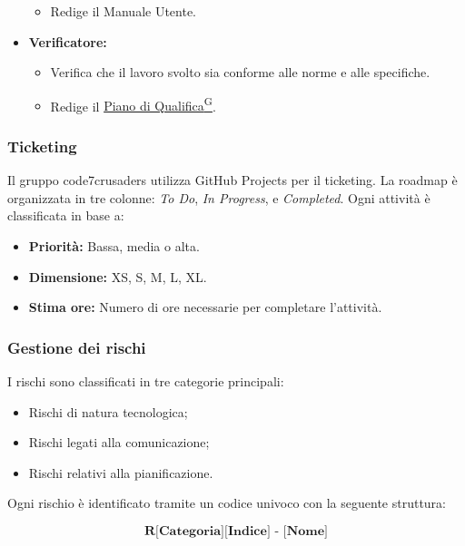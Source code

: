 \begin{itemize}
\begin{itemize}
        \item Redige il Manuale Utente.
    \end{itemize}
    \item \textbf{Verificatore:}
    \begin{itemize}
        \item Verifica che il lavoro svolto sia conforme alle norme e alle specifiche.
        \item Redige il \href{https://code7crusaders.github.io/docs/RTB/documentazione_interna/glossario.html#piano-di-qualifica}{Piano di Qualifica\textsuperscript{G}}.
    \end{itemize}
\end{itemize}

\subsubsection{Ticketing}
Il gruppo code7crusaders utilizza GitHub Projects per il ticketing. La roadmap è organizzata in tre colonne: \textit{To Do}, \textit{In Progress}, e \textit{Completed}. Ogni attività è classificata in base a:
\begin{itemize}
    \item \textbf{Priorità:} Bassa, media o alta.
    \item \textbf{Dimensione:} XS, S, M, L, XL.
    \item \textbf{Stima ore:} Numero di ore necessarie per completare l’attività.
\end{itemize}

\subsubsection{Gestione dei rischi}
I rischi sono classificati in tre categorie principali:
\begin{itemize}
    \item Rischi di natura tecnologica;
    \item Rischi legati alla comunicazione;
    \item Rischi relativi alla pianificazione.
\end{itemize}

Ogni rischio è identificato tramite un codice univoco con la seguente struttura:

\[
\textbf{R[Categoria][Indice] - [Nome]}
\]

